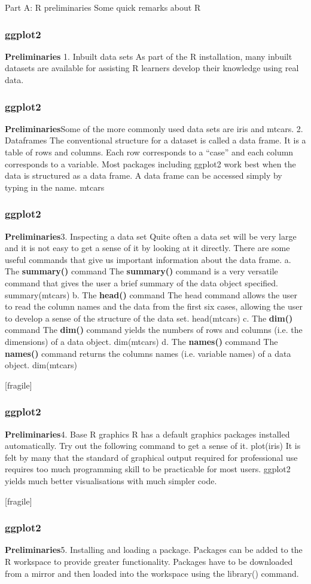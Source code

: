 Part A: R preliminaries
Some quick remarks about R


\frametitle{ggplot2}
\large
\noindent \textbf{Preliminaries}
1. Inbuilt data sets
As part of the R installation, many inbuilt datasets are available for assisting R learners develop their knowledge using real data.


\frametitle{ggplot2}
\large
\noindent \textbf{Preliminaries}Some of the more commonly used data sets are iris and mtcars.
2. Dataframes
The conventional structure for a dataset is called a data frame. It is a table of rows and columns. Each row corresponds to a “case” and each column corresponds to a variable. Most packages including ggplot2 work best when the data is structured as a data frame.
A data frame can be accessed simply by typing in the name. mtcars


\frametitle{ggplot2}
\large
\noindent \textbf{Preliminaries}3. Inspecting a data set
Quite often a data set will be very large and it is not easy to get a sense of it by looking at it directly. There are some useful commands that give us important information about the data frame.
a. The \textbf{summary()} command
The \textbf{summary()} command is a very versatile command that gives the user a brief summary of the data object specified. summary(mtcars)
b. The \textbf{head()} command
The head command allows the user to read the column names and the data from the first six cases, allowing the user to develop a sense of the structure of the data set. head(mtcars)
c. The \textbf{dim()} command
The \textbf{dim()} command yields the numbers of rows and columns (i.e. the dimensions) of a data object. dim(mtcars)
d. The \textbf{names()} command
The \textbf{names()} command returns the columns names (i.e. variable names) of a data object. dim(mtcars)

[fragile]
\frametitle{ggplot2}
\large
\noindent \textbf{Preliminaries}4. Base R graphics
R has a default graphics packages installed automatically. Try out the following command to get a sense of it. plot(iris)
It is felt by many that the standard of graphical output required for professional use requires too much programming skill to be practicable for most users.
ggplot2 yields much better visualisations with much simpler code.

[fragile]
\frametitle{ggplot2}
\large
\noindent \textbf{Preliminaries}5. Installing and loading a package.
Packages can be added to the R workspace to provide greater functionality. 
Packages have to be downloaded from a mirror and then loaded into the workspace using the library() command. 

